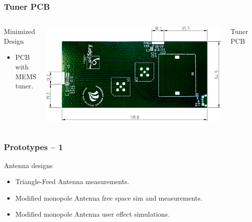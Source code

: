 \begin{frame}[fragile]
    \frametitle{Tuner PCB}
    \begin{columns}[onlytextwidth,t]
        \begin{block}{Minimized Design}
          \begin{itemize}
          \item PCB with MEMS tuner.
          \end{itemize}
        \end{block}
        \begin{center}
            \includegraphics[scale=0.33]{img/Lasse/samanthas_board.pdf}
        \end{center}
        Tuner PCB
    \end{columns}
\end{frame}

\begin{frame}
  \frametitle{Prototypes -- 1}
  \begin{block}{Antenna designs}
      \begin{itemize}
      \item Triangle-Feed Antenna measurements.
      \item Modified monopole Antenna free space sim and measurements.
      \item Modified monopole Antenna user effect simulations.
      \end{itemize}
  \end{block}
\end{frame}

